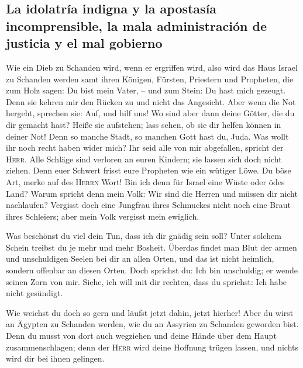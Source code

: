 \hypertarget{la-idolatruxeda-indigna-y-la-apostasuxeda-incomprensible-la-mala-administraciuxf3n-de-justicia-y-el-mal-gobierno}{%
\subsection{La idolatría indigna y la apostasía incomprensible, la mala
administración de justicia y el mal
gobierno}\label{la-idolatruxeda-indigna-y-la-apostasuxeda-incomprensible-la-mala-administraciuxf3n-de-justicia-y-el-mal-gobierno}}

 Wie ein Dieb zu Schanden wird, wenn er ergriffen wird,
also wird das Haus Israel zu Schanden werden samt ihren Königen,
Fürsten, Priestern und Propheten,  die zum Holz sagen: Du
bist mein Vater, -- und zum Stein: Du hast mich gezeugt. Denn sie kehren
mir den Rücken zu und nicht das Angesicht. Aber wenn die Not hergeht,
sprechen sie: Auf, und hilf uns!  Wo sind aber dann deine
Götter, die du dir gemacht hast? Heiße sie aufstehen; lass sehen, ob sie
dir helfen können in deiner Not! Denn so manche Stadt, so manchen Gott
hast du, Juda.  Was wollt ihr noch recht haben wider
mich? Ihr seid alle von mir abgefallen, spricht der \textsc{Herr}.
 Alle Schläge sind verloren an euren Kindern; sie lassen
sich doch nicht ziehen. Denn euer Schwert frisst eure Propheten wie ein
wütiger Löwe.  Du böse Art, merke auf des \textsc{Herrn}
Wort! Bin ich denn für Israel eine Wüste oder ödes Land? Warum spricht
denn mein Volk: Wir sind die Herren und müssen dir nicht nachlaufen?
 Vergisst doch eine Jungfrau ihres Schmuckes nicht noch
eine Braut ihres Schleiers; aber mein Volk vergisst mein ewiglich.

 Was beschönst du viel dein Tun, dass ich dir gnädig sein
soll? Unter solchem Schein treibst du je mehr und mehr Bosheit.
 Überdas findet man Blut der armen und unschuldigen
Seelen bei dir an allen Orten, und das ist nicht heimlich, sondern
offenbar an diesen Orten.  Doch sprichst du: Ich bin
unschuldig; er wende seinen Zorn von mir. Siehe, ich will mit dir
rechten, dass du sprichst: Ich habe nicht gesündigt.

 Wie weichst du doch so gern und läufst jetzt dahin,
jetzt hierher! Aber du wirst an Ägypten zu Schanden werden, wie du an
Assyrien zu Schanden geworden bist.  Denn du musst von
dort auch wegziehen und deine Hände über dem Haupt zusammenschlagen;
denn der \textsc{Herr} wird deine Hoffnung trügen lassen, und nichts
wird dir bei ihnen gelingen.

